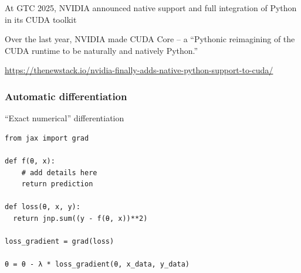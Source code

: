 \begin{frame}

    \textbf{}
    
    \vspace{0.5em}
    At GTC 2025, NVIDIA announced native support and full integration of Python in its CUDA toolkit

    \vspace{0.5em}
    Over the last year, NVIDIA made CUDA Core -- a ``Pythonic
    reimagining of the CUDA runtime to be naturally and natively Python.''

    \vspace{0.5em}
    \vspace{0.5em}
    \vspace{0.5em}

    \footnotesize{
        \url{https://thenewstack.io/nvidia-finally-adds-native-python-support-to-cuda/}
    }

\end{frame}


\begin{frame}[fragile]
    \frametitle{Automatic differentiation}

    \vspace{0.5em}
    ``Exact numerical'' differentiation
    
    \begin{verbatim}
from jax import grad

def f(θ, x):
    # add details here
    return prediction

def loss(θ, x, y):
  return jnp.sum((y - f(θ, x))**2)

loss_gradient = grad(loss)

θ = θ - λ * loss_gradient(θ, x_data, y_data)
    \end{verbatim}

\end{frame}



